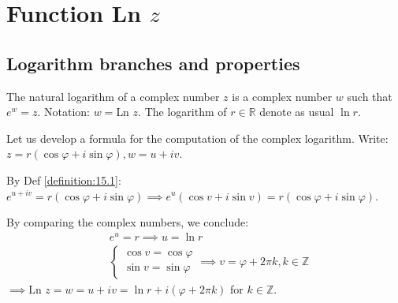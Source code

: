 
% 
% 
% 
% 
% 
% 
% 
% 
% 
% 
% 

\graphicspath{{./input/graphs/note07/}}


% 




\section{Function Ln $z$}

\subsection{Logarithm branches and properties}

\begin{definition}\label{definition:15.1}
     The natural logarithm of a complex number $z$ is a complex number $w$ such that $e^w = z$. Notation: $w = \text{Ln } z$.
        The logarithm of $r \in \mathbb{R}$ denote as usual $\ln r$.
\end{definition}

Let us develop a formula for the computation of the complex logarithm. Write: $z = r(\cos \varphi + i\sin \varphi), w = u + iv$.

By Def \ref{definition:15.1}: $e^{u+iv} = r(\cos \varphi + i\sin \varphi) \implies e^u (\cos v + i\sin v) = r(\cos \varphi + i\sin \varphi)$.

By comparing the complex numbers, we conclude:
\begin{align*}
    &e^u = r \implies u = \ln r \\
    &\begin{cases}
    \cos v = \cos \varphi \\
    \sin v = \sin \varphi
    \end{cases} \implies v = \varphi + 2\pi k, k \in \mathbb{Z}
\end{align*}
$\implies \text{Ln } z = w = u + iv = \ln r + i(\varphi + 2\pi k)$ for $k \in \mathbb{Z}$.

